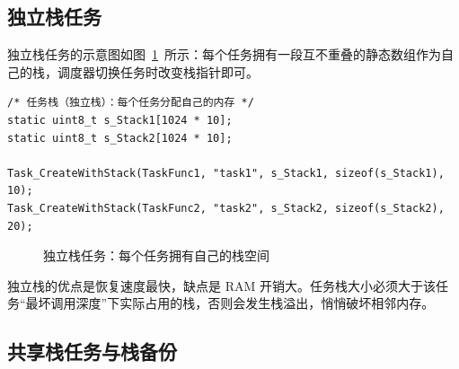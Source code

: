 \subsection{独立栈任务}

独立栈任务的示意图如图~\ref{fig:unique-stack}~所示：每个任务拥有一段互不重叠的静态数组作为自己的栈，调度器切换任务时改变栈指针即可。

\begin{lstlisting}[style=c]
/* 任务栈（独立栈）：每个任务分配自己的内存 */
static uint8_t s_Stack1[1024 * 10];
static uint8_t s_Stack2[1024 * 10];

Task_CreateWithStack(TaskFunc1, "task1", s_Stack1, sizeof(s_Stack1), 10);
Task_CreateWithStack(TaskFunc2, "task2", s_Stack2, sizeof(s_Stack2), 20);
\end{lstlisting}

\begin{figure}[htbp]
\centering
\caption{独立栈任务：每个任务拥有自己的栈空间} \label{fig:unique-stack}
\end{figure}

独立栈的优点是恢复速度最快，缺点是 RAM 开销大。任务栈大小必须大于该任务“最坏调用深度”下实际占用的栈，否则会发生栈溢出，悄悄破坏相邻内存。

\subsection{共享栈任务与栈备份}


